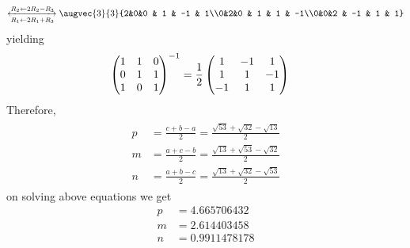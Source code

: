 \documentclass[11pt]{book}
\begin{document}
\begin{enumerate}[label=\thesection.\arabic*.,ref=\thesection.\theenumi]
\begin{align}
\xleftrightarrow[R_1 \leftarrow 2R_1 + R_3]{R_2 \leftarrow 2R_2 - R_3}
\augvec{3}{3}{2&0&0 & 1 & -1 & 1\\0&2&0 & 1 & 1 & -1\\0&0&2 & -1 & 1 & 1}
\end{align}
yielding
\begin{align}
\begin{pmatrix}1&1&0\\0&1&1\\1&0&1\\\end{pmatrix}^{-1} &= \frac{1}{2}\begin{pmatrix}1 & -1 & 1\\ 1 & 1 & -1\\ -1 & 1 & 1\end{pmatrix}
	\end{align}
	Therefore,
\begin{align}
\begin{split}
    p&=\frac{c+b-a}{2}
    =\frac{\sqrt{53}+\sqrt{32}-\sqrt{13}}{2}
    \\
    m&=\frac{a+c-b}{2}
    =\frac{\sqrt{13}+\sqrt{53}-\sqrt{32}}{2}
    \\
    n&=\frac{a+b-c}{2}
    =\frac{\sqrt{13}+\sqrt{32}-\sqrt{53}}{2}
\end{split}
\label{eq:incircle-mnp}
\end{align}
on solving above equations we get
\begin{align}
	p &= 4.665706432\\
	m &= 2.614403458\\
	n &= 0.9911478178
\end{align}
 

\end{enumerate}
\end{document}
